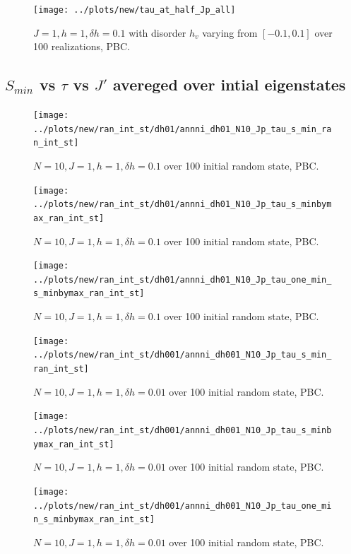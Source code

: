 \documentclass[a4paper]{article}
\begin{document}
\begin{figure}[h!]
  \centering
  \texttt{[image: ../plots/new/tau\_at\_half\_Jp\_all]}
  \caption{$J = 1, h = 1, \delta h=0.1$ with disorder $h_v$ varying from $[-0.1,0.1]$ over 100 realizations, PBC.}
  \label{fig:}
\end{figure}

\clearpage
\subsection{$S_{min}$ vs $\tau$ vs $J'$ avereged over intial eigenstates}
\begin{figure}[h!]
  \centering
  \texttt{[image: ../plots/new/ran\_int\_st/dh01/annni\_dh01\_N10\_Jp\_tau\_s\_min\_ran\_int\_st]}
  \caption{$N = 10, J = 1, h = 1, \delta h=0.1$  over 100 initial random state, PBC.}
  \label{fig:}
\end{figure}

\begin{figure}[h!]
  \centering
  \texttt{[image: ../plots/new/ran\_int\_st/dh01/annni\_dh01\_N10\_Jp\_tau\_s\_minbymax\_ran\_int\_st]}
  \caption{$N = 10, J = 1, h = 1, \delta h=0.1$ over 100 initial random state, PBC.}
  \label{fig:}
\end{figure}

\begin{figure}[h!]
  \centering
  \texttt{[image: ../plots/new/ran\_int\_st/dh01/annni\_dh01\_N10\_Jp\_tau\_one\_min\_s\_minbymax\_ran\_int\_st]}
  \caption{$N = 10, J = 1, h = 1, \delta h=0.1$ over 100 initial random state, PBC.}
  \label{fig:}
\end{figure}


\begin{figure}[h!]
  \centering
  \texttt{[image: ../plots/new/ran\_int\_st/dh001/annni\_dh001\_N10\_Jp\_tau\_s\_min\_ran\_int\_st]}
  \caption{$N = 10, J = 1, h = 1, \delta h=0.01$  over 100 initial random state, PBC.}
  \label{fig:}
\end{figure}

\begin{figure}[h!]
  \centering
  \texttt{[image: ../plots/new/ran\_int\_st/dh001/annni\_dh001\_N10\_Jp\_tau\_s\_minbymax\_ran\_int\_st]}
  \caption{$N = 10, J = 1, h = 1, \delta h=0.01$ over 100 initial random state, PBC.}
  \label{fig:}
\end{figure}

\begin{figure}[h!]
  \centering
  \texttt{[image: ../plots/new/ran\_int\_st/dh001/annni\_dh001\_N10\_Jp\_tau\_one\_min\_s\_minbymax\_ran\_int\_st]}
  \caption{$N = 10, J = 1, h = 1, \delta h=0.01$ over 100 initial random state, PBC.}
  \label{fig:}
\end{figure}
\end{document}
